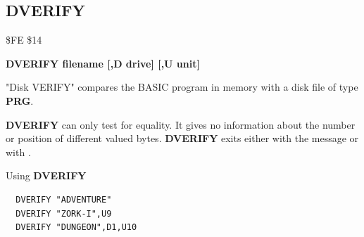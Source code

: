 
\newpage
\subsection{DVERIFY}
\begin{description}[leftmargin=2cm,style=nextline]
\item [Token:] \$FE \$14
\item [Format:] {\bf DVERIFY filename [,D drive] [,U unit] }
\item [Usage:]
   "Disk VERIFY" compares the BASIC program
   in memory with a disk file of type {\bf PRG}.

   \filenamedefinition

   \drivedefinition

   \unitdefinition

\item [Remarks:]
   {\bf DVERIFY} can only test for equality. It gives no information
   about the number or position of different valued bytes.
    {\bf DVERIFY} exits either with the message 
    or with .

\item [Example:] Using {\bf DVERIFY}
\begin{tcolorbox}[colback=black,coltext=white]
\verbatimfont{\codefont}
\begin{verbatim}
  DVERIFY "ADVENTURE"
  DVERIFY "ZORK-I",U9
  DVERIFY "DUNGEON",D1,U10
\end{verbatim}
\end{tcolorbox}
\end{description}


\newpage
